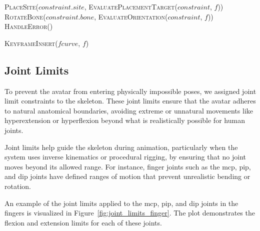 \documentclass[../../main.tex]{subfiles}
\begin{document}
{\begin{algorithm}
\begin{algorithmic}[1]
                \State \textsc{PlaceSite}($constraint.site$, \textsc{EvaluatePlacementTarget}($constraint$, $f$))
                \State \textsc{RotateBone}($constraint.bone$, \textsc{EvaluateOrientation}($constraint$, $f$))
            \Else
                \State \textsc{HandleError}()
            \EndIf
        \EndProcedure
        
                \State \textsc{KeyframeInsert}($fcurve$, $f$)
            \EndFor
        \EndProcedure
    \end{algorithmic}
\end{algorithm}

\subsection{Joint Limits}
\label{ch:avatar_creation_pose_synthesis:proc_rig_signing_avatars:joint_limits}

To prevent the avatar from entering physically impossible poses, we assigned joint limit constraints to the skeleton. These joint limits ensure that the avatar adheres to natural anatomical boundaries, avoiding extreme or unnatural movements like hyperextension or hyperflexion beyond what is realistically possible for human joints.

Joint limits help guide the skeleton during animation, particularly when the system uses inverse kinematics or procedural rigging, by ensuring that no joint moves beyond its allowed range. For instance, finger joints such as the \gls{mcp}, \gls{pip}, and \gls{dip} joints have defined ranges of motion that prevent unrealistic bending or rotation.

An example of the joint limits applied to the \gls{mcp}, \gls{pip}, and \gls{dip} joints in the fingers is visualized in Figure~\ref{fig:joint_limits_finger}. The plot demonstrates the flexion and extension limits for each of these joints.

}
\end{document}
